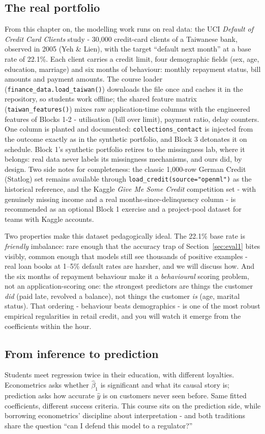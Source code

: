 \documentclass[11pt,a4paper]{article}
\begin{document}
\subsection{The real portfolio}
From this chapter on, the modelling work runs on real data: the UCI
\emph{Default of Credit Card Clients} study - 30{,}000 credit-card
clients of a Taiwanese bank, observed in 2005 (Yeh \& Lien), with the
target ``default next month'' at a base rate of 22.1\%. Each client
carries a credit limit, four demographic fields (sex, age, education,
marriage) and six months of behaviour: monthly repayment status, bill
amounts and payment amounts. The course loader
(\texttt{finance\_data.load\_taiwan()}) downloads the file once and caches
it in the repository, so students work offline; the shared feature matrix
(\texttt{taiwan\_features()}) mixes raw application-time columns with the
engineered features of Blocks 1-2 - utilisation (bill over limit),
payment ratio, delay counters. One column is planted and documented:
\texttt{collections\_contact} is injected from the outcome exactly as in
the synthetic portfolio, and Block 3 detonates it on schedule. Block 1's
synthetic portfolio retires to the missingness lab, where it belongs:
real data never labels its missingness mechanisms, and ours did, by
design. Two side notes for completeness: the classic 1{,}000-row German
Credit (Statlog) set remains available through
\texttt{load\_credit(source="openml")} as the historical reference, and
the Kaggle \emph{Give Me Some Credit} competition set - with genuinely
missing income and a real months-since-delinquency column - is
recommended as an optional Block 1 exercise and a project-pool dataset
for teams with Kaggle accounts.

Two properties make this dataset pedagogically ideal. The 22.1\% base
rate is \emph{friendly} imbalance: rare enough that the accuracy trap of
Section~\ref{sec:eval1} bites visibly, common enough that models still
see thousands of positive examples - real loan books at 1--5\% default
rates are harsher, and we will discuss how. And the six months of
repayment behaviour make it a \emph{behavioural} scoring problem, not an
application-scoring one: the strongest predictors are things the customer
\emph{did} (paid late, revolved a balance), not things the customer
\emph{is} (age, marital status). That ordering - behaviour beats
demographics - is one of the most robust empirical regularities in
retail credit, and you will watch it emerge from the coefficients within
the hour.

\subsection{From inference to prediction}
Students meet regression twice in their education, with different
loyalties. Econometrics asks whether $\hat\beta_1$ is significant and what
its causal story is; prediction asks how accurate $\hat{y}$ is on customers
never seen before. Same fitted coefficients, different success criteria.
This course sits on the prediction side, while borrowing econometrics'
discipline about interpretation - and both traditions share the question
``can I defend this model to a regulator?''
\end{document}
